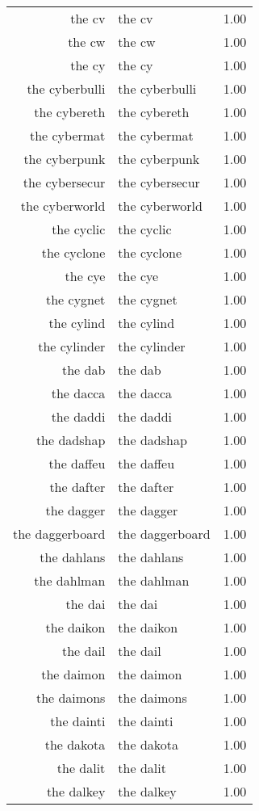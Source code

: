 \begin{table}[ht]
\begin{tabular}{rlr}
  the cv & the cv & 1.00 \\ 
  the cw & the cw & 1.00 \\ 
  the cy & the cy & 1.00 \\ 
  the cyberbulli & the cyberbulli & 1.00 \\ 
  the cybereth & the cybereth & 1.00 \\ 
  the cybermat & the cybermat & 1.00 \\ 
  the cyberpunk & the cyberpunk & 1.00 \\ 
  the cybersecur & the cybersecur & 1.00 \\ 
  the cyberworld & the cyberworld & 1.00 \\ 
  the cyclic & the cyclic & 1.00 \\ 
  the cyclone & the cyclone & 1.00 \\ 
  the cye & the cye & 1.00 \\ 
  the cygnet & the cygnet & 1.00 \\ 
  the cylind & the cylind & 1.00 \\ 
  the cylinder & the cylinder & 1.00 \\ 
  the dab & the dab & 1.00 \\ 
  the dacca & the dacca & 1.00 \\ 
  the daddi & the daddi & 1.00 \\ 
  the dadshap & the dadshap & 1.00 \\ 
  the daffeu & the daffeu & 1.00 \\ 
  the dafter & the dafter & 1.00 \\ 
  the dagger & the dagger & 1.00 \\ 
  the daggerboard & the daggerboard & 1.00 \\ 
  the dahlans & the dahlans & 1.00 \\ 
  the dahlman & the dahlman & 1.00 \\ 
  the dai & the dai & 1.00 \\ 
  the daikon & the daikon & 1.00 \\ 
  the dail & the dail & 1.00 \\ 
  the daimon & the daimon & 1.00 \\ 
  the daimons & the daimons & 1.00 \\ 
  the dainti & the dainti & 1.00 \\ 
  the dakota & the dakota & 1.00 \\ 
  the dalit & the dalit & 1.00 \\ 
  the dalkey & the dalkey & 1.00 \\ 

\end{tabular}
\end{table}
